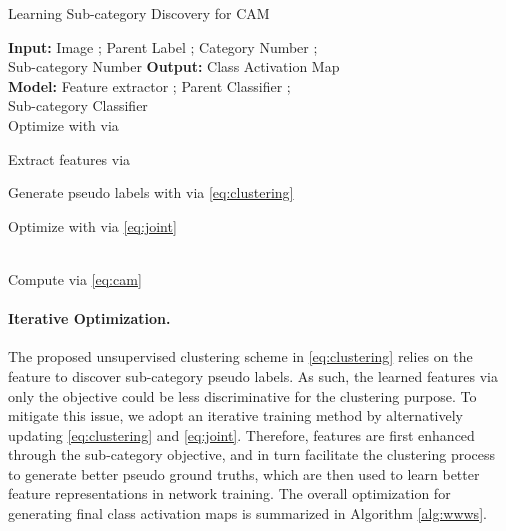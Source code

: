 \documentclass[10pt,twocolumn,letterpaper]{article}
\begin{document}
\begin{algorithm}[!t]
\vspace{0.1in}
\caption{Learning Sub-category Discovery for CAM}\label{alg:wwws}
\begin{algorithmic}
\State \textbf{Input:} Image ; Parent Label ; Category Number ; \\ Sub-category Number 
\State \textbf{Output:} Class Activation Map \\

\State \textbf{Model:} Feature extractor ; Parent Classifier ; \\ Sub-category Classifier  \\

\State Optimize  with  via 

\State Extract features via 

\State Generate pseudo labels  with  via \eqref{eq:clustering}
\EndFor

\State Optimize  with  via \eqref{eq:joint}

\EndWhile
\\
Compute  via \eqref{eq:cam}
\end{algorithmic}
\end{algorithm}
\vspace{-1mm}









\paragraph{Iterative Optimization.}
The proposed unsupervised clustering scheme in \eqref{eq:clustering} relies on the feature  to discover sub-category pseudo labels. 
As such, the learned features via only the objective  could be less discriminative for the clustering purpose.
To mitigate this issue, we adopt an iterative training method by alternatively updating \eqref{eq:clustering} and \eqref{eq:joint}.
Therefore, features  are first enhanced through the sub-category objective, and in turn facilitate the clustering process to generate better pseudo ground truths, which are then used to learn better feature representations in network training.
The overall optimization for generating final class activation maps is summarized in Algorithm \ref{alg:wwws}.
\end{document}
